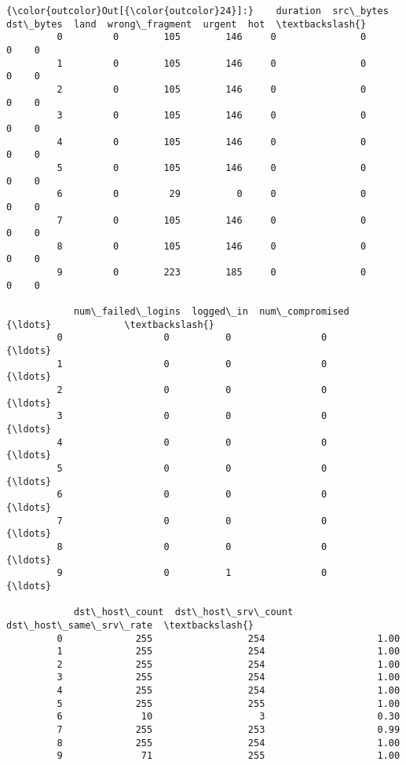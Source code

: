 \documentclass[11pt]{article}
\begin{document}
\begin{Verbatim}[commandchars=\\\{\}]
{\color{outcolor}Out[{\color{outcolor}24}]:}    duration  src\_bytes  dst\_bytes  land  wrong\_fragment  urgent  hot  \textbackslash{}
         0         0        105        146     0               0       0    0   
         1         0        105        146     0               0       0    0   
         2         0        105        146     0               0       0    0   
         3         0        105        146     0               0       0    0   
         4         0        105        146     0               0       0    0   
         5         0        105        146     0               0       0    0   
         6         0         29          0     0               0       0    0   
         7         0        105        146     0               0       0    0   
         8         0        105        146     0               0       0    0   
         9         0        223        185     0               0       0    0   
         
            num\_failed\_logins  logged\_in  num\_compromised            {\ldots}             \textbackslash{}
         0                  0          0                0            {\ldots}              
         1                  0          0                0            {\ldots}              
         2                  0          0                0            {\ldots}              
         3                  0          0                0            {\ldots}              
         4                  0          0                0            {\ldots}              
         5                  0          0                0            {\ldots}              
         6                  0          0                0            {\ldots}              
         7                  0          0                0            {\ldots}              
         8                  0          0                0            {\ldots}              
         9                  0          1                0            {\ldots}              
         
            dst\_host\_count  dst\_host\_srv\_count  dst\_host\_same\_srv\_rate  \textbackslash{}
         0             255                 254                    1.00   
         1             255                 254                    1.00   
         2             255                 254                    1.00   
         3             255                 254                    1.00   
         4             255                 254                    1.00   
         5             255                 255                    1.00   
         6              10                   3                    0.30   
         7             255                 253                    0.99   
         8             255                 254                    1.00   
         9              71                 255                    1.00   
         

\end{Verbatim}
\end{document}
